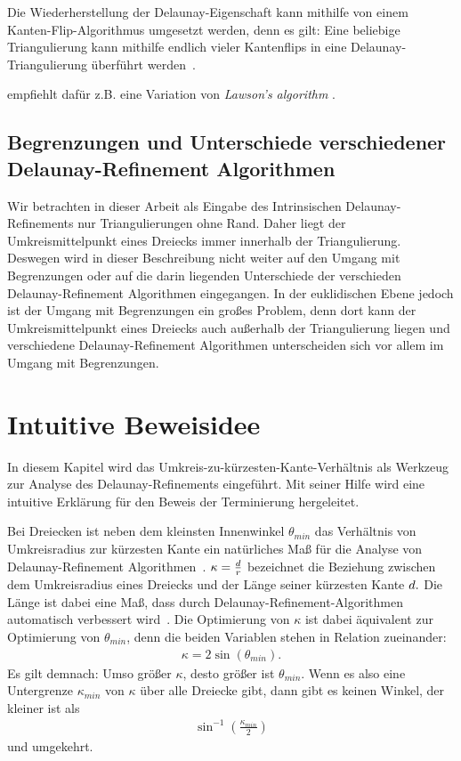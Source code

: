 Die Wiederherstellung der Delaunay-Eigenschaft kann mithilfe von einem Kanten-Flip-Algorithmus umgesetzt werden, denn es gilt: Eine beliebige Triangulierung kann mithilfe endlich vieler Kantenflips in eine Delaunay-Triangulierung überführt werden~\cite{shewchuk:1997:delaunay}.

\citeauthor{SHEWCHUK:2002:chuws} empfiehlt dafür z.B. eine Variation von \textit{Lawson’s algorithm} \cite{lawson:1977:lawson-algorithmus}. 

\subsection*{Begrenzungen und Unterschiede verschiedener Delaunay-Refinement Algorithmen}
Wir betrachten in dieser Arbeit als Eingabe des Intrinsischen Delaunay-Refinements nur  Triangulierungen ohne Rand. Daher liegt der Umkreismittelpunkt eines Dreiecks immer innerhalb der Triangulierung. Deswegen wird in dieser Beschreibung nicht weiter auf den Umgang mit Begrenzungen oder auf die darin liegenden Unterschiede der verschieden Delaunay-Refinement Algorithmen eingegangen. In der euklidischen Ebene jedoch ist der Umgang mit Begrenzungen ein großes Problem, denn dort kann der Umkreismittelpunkt eines Dreiecks auch außerhalb der Triangulierung liegen und verschiedene Delaunay-Refinement Algorithmen unterscheiden sich vor allem im Umgang mit Begrenzungen. 

\newpage
\section*{Intuitive Beweisidee}

In diesem Kapitel wird das Umkreis-zu-kürzesten-Kante-Verhältnis als Werkzeug zur Analyse des Delaunay-Refinements eingeführt. Mit seiner Hilfe wird eine intuitive Erklärung für den Beweis der Terminierung hergeleitet. 



Bei Dreiecken ist neben dem kleinsten Innenwinkel  $\theta_{min}$  das Verhältnis von Umkreisradius zur kürzesten Kante ein natürliches Maß für die Analyse von Delaunay-Refinement Algorithmen~\cite{MiTaTeWa1995ACM}. $\kappa = \frac{\kuezesteKante*}{ \umkreisradius*}$ bezeichnet die Beziehung zwischen dem Umkreisradius \umkreisradius eines Dreiecks und der Länge seiner kürzesten Kante $\kuezesteKante*.$ Die Länge \kuezesteKante ist dabei eine Maß, dass durch Delaunay-Refinement-Algorithmen automatisch verbessert wird~\cite{SHEWCHUK:2002:chuws}. Die Optimierung von $\kappa$ ist dabei äquivalent zur Optimierung von  $\theta_{min}$, denn die beiden Variablen stehen in Relation zueinander:
\begin{align*}
 \kappa = 2\sin(\theta_{min}).   
\end{align*}
Es gilt demnach: Umso größer $\kappa$, desto größer ist $\theta_{min}$. Wenn es also eine Untergrenze $\kappa_{min}$ von $\kappa$ über alle Dreiecke  gibt, dann gibt es keinen Winkel, der kleiner ist als \begin{align*}
    \sin^{-1}(\frac{\kappa_{min}}{2 })
\end{align*} und umgekehrt. 

